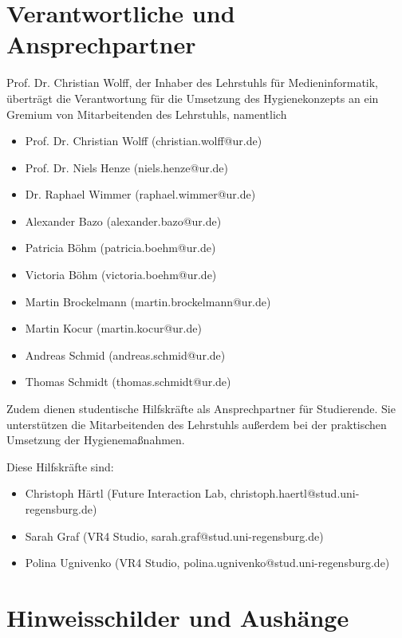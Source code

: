 \clearpage

\appendix

\section{Verantwortliche und Ansprechpartner}\label{app:verantwortliche}

\noindent
Prof. Dr. Christian Wolff, der Inhaber des Lehrstuhls für Medieninformatik, überträgt die Verantwortung für die Umsetzung des Hygienekonzepts an ein Gremium von Mitarbeitenden des Lehrstuhls, namentlich

\begin{itemize}
    \item Prof. Dr. Christian Wolff (christian.wolff@ur.de)
    \item Prof. Dr. Niels Henze (niels.henze@ur.de)
    \item Dr. Raphael Wimmer (raphael.wimmer@ur.de)
    \item Alexander Bazo (alexander.bazo@ur.de)
    \item Patricia Böhm (patricia.boehm@ur.de)
    \item Victoria Böhm (victoria.boehm@ur.de)
    \item Martin Brockelmann (martin.brockelmann@ur.de)
    \item Martin Kocur (martin.kocur@ur.de)
    \item Andreas Schmid (andreas.schmid@ur.de)
    \item Thomas Schmidt (thomas.schmidt@ur.de)
\end{itemize}

\noindent
Zudem dienen studentische Hilfskräfte als Ansprechpartner für Studierende.
Sie unterstützen die Mitarbeitenden des Lehrstuhls außerdem bei der praktischen Umsetzung der Hygienemaßnahmen.

Diese Hilfskräfte sind:

\begin{itemize}
    \item Christoph Härtl (Future Interaction Lab, christoph.haertl@stud.uni-regensburg.de)
    \item Sarah Graf (VR4 Studio, sarah.graf@stud.uni-regensburg.de)
    \item Polina Ugnivenko (VR4 Studio, polina.ugnivenko@stud.uni-regensburg.de)
\end{itemize}

\section{Hinweisschilder und Aushänge}\label{app:hinweisschilder}

